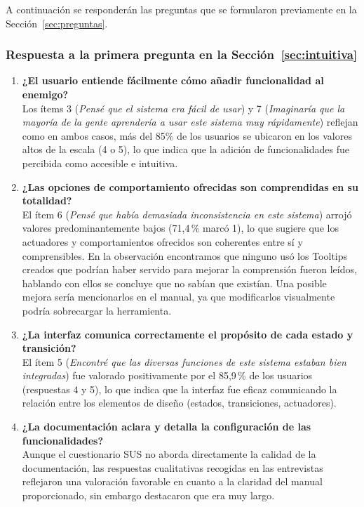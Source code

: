 A continuación se responderán las preguntas que se formularon previamente en la Sección~\ref{sec:preguntas}.


\subsubsection{Respuesta a la primera pregunta en la Sección~\ref{sec:intuitiva}}

\begin{enumerate}
    \item \textbf{¿El usuario entiende fácilmente cómo añadir funcionalidad al enemigo?} \\

Los ítems 3 (\textit{Pensé que el sistema era fácil de usar}) y 7 (\textit{Imaginaría que la mayoría de la gente aprendería a usar este sistema muy rápidamente}) reflejan como en ambos casos, más del 85\% de los usuarios se ubicaron en los valores altos de la escala (4 o 5), lo que indica que la adición de funcionalidades fue percibida como accesible e intuitiva. 

    \item \textbf{¿Las opciones de comportamiento ofrecidas son comprendidas en su totalidad?} \\

El ítem 6 (\textit{Pensé que había demasiada inconsistencia en este sistema}) arrojó valores predominantemente bajos (71,4\,\% marcó 1), lo que sugiere que los actuadores y comportamientos ofrecidos son coherentes entre sí y comprensibles. En la observación encontramos que ninguno usó los Tooltips creados que podrían haber servido para mejorar la comprensión fueron leídos, hablando con ellos se concluye que no sabían  que existían. Una posible mejora sería mencionarlos en el manual, ya que modificarlos visualmente podría sobrecargar la herramienta.

    \item \textbf{¿La interfaz comunica correctamente el propósito de cada estado y transición?} \\

El ítem 5 (\textit{Encontré que las diversas funciones de este sistema estaban bien integradas}) fue valorado positivamente por el 85,9\,\% de los usuarios (respuestas 4 y 5), lo que indica que la interfaz fue eficaz comunicando la relación entre los elementos de diseño (estados, transiciones, actuadores).

    \item \textbf{¿La documentación aclara y detalla la configuración de las funcionalidades?} \\

Aunque el cuestionario SUS no aborda directamente la calidad de la documentación, las respuestas cualitativas recogidas en las entrevistas reflejaron una valoración favorable en cuanto a la claridad del manual proporcionado, sin embargo destacaron que era muy largo. 
\end{enumerate}

